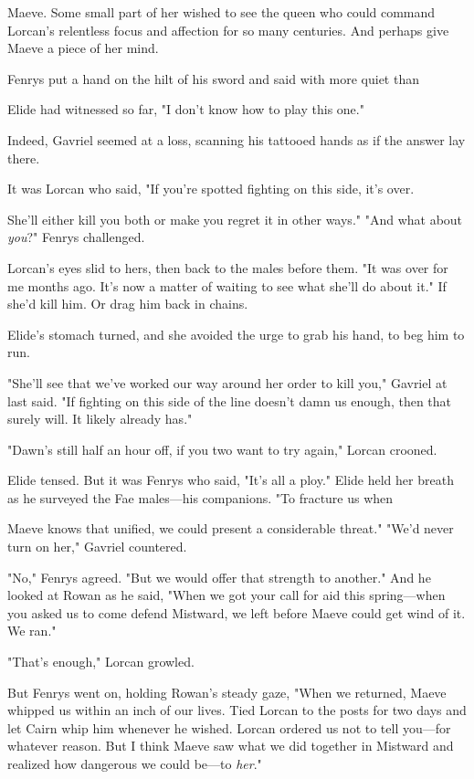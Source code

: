 Maeve. Some small part of her wished to see the queen who could command Lorcan's relentless focus and affection for so many centuries. And perhaps give Maeve a piece of her mind.

Fenrys put a hand on the hilt of his sword and said with more quiet than

Elide had witnessed so far, "I don't know how to play this one."

Indeed, Gavriel seemed at a loss, scanning his tattooed hands as if the answer lay there.

It was Lorcan who said, "If you're spotted fighting on this side, it's over.

She'll either kill you both or make you regret it in other ways." "And what about \emph{you}?" Fenrys challenged.

Lorcan's eyes slid to hers, then back to the males before them. "It was over for me months ago. It's now a matter of waiting to see what she'll do about it." If she'd kill him. Or drag him back in chains.

Elide's stomach turned, and she avoided the urge to grab his hand, to beg him to run.

"She'll see that we've worked our way around her order to kill you," Gavriel at last said. "If fighting on this side of the line doesn't damn us enough, then that surely will. It likely already has."

"Dawn's still half an hour off, if you two want to try again," Lorcan crooned.

Elide tensed. But it was Fenrys who said, "It's all a ploy." Elide held her breath as he surveyed the Fae males---his companions. "To fracture us when

Maeve knows that unified, we could present a considerable threat." "We'd never turn on her," Gavriel countered.

"No," Fenrys agreed. "But we would offer that strength to another." And he looked at Rowan as he said, "When we got your call for aid this spring---when you asked us to come defend Mistward, we left before Maeve could get wind of it. We ran."

"That's enough," Lorcan growled.

But Fenrys went on, holding Rowan's steady gaze, "When we returned, Maeve whipped us within an inch of our lives. Tied Lorcan to the posts for two days and let Cairn whip him whenever he wished. Lorcan ordered us not to tell you---for whatever reason. But I think Maeve saw what we did together in Mistward and realized how dangerous we could be---to
\emph{her}."

